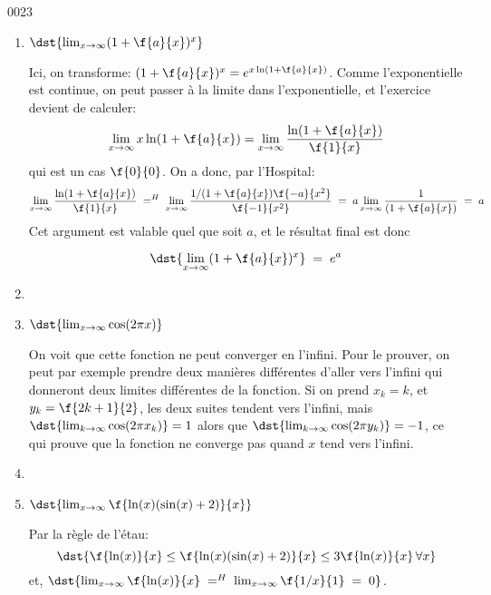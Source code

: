 \begin{corrige}{0023}
\begin{alternative}
\begin{enumerate}
		\item $\dst{ \lim_{x\rightarrow  \infty}(1+\f{a}{x})^x}$ \hs
		 
		Ici, on transforme: $ (1+\f{a}{x})^x = e^{x\ln(1+\f{a}{x})}$. Comme l'exponentielle est continue, on peut passer à la limite dans l'exponentielle, et l'exercice devient de calculer:
		 \[\lim_{x\rightarrow  \infty}x\ln(1+\f{a}{x}) = \lim_{x\rightarrow  \infty}\dfrac{\ln(1+\f{a}{x})}{\f{1}{x}}\]
		qui est un cas $\f{0}{0}$. On a donc, par l'Hospital:
		  \[\lim_{x\rightarrow  \infty}\dfrac{\ln(1+\f{a}{x})}{\f{1}{x}} \; =^H\;   \lim_{x\rightarrow  \infty}\dfrac{1/(1+\f{a}{x})\f{-a}{x^2}}{\f{-1}{x^2}} \; = \;      a\lim_{x\rightarrow  \infty}\dfrac{1}{(1+\f{a}{x})}   \;=\; a       \]
		Cet argument est valable quel que soit $a$, et le résultat final est donc  
		 
		 \[\dst{ \lim_{x\rightarrow  \infty}(1+\f{a}{x})^x} \;= \; e^a\] 
		 
		\item

		 \item $\dst{\lim_{x\rightarrow \infty} \cos(2\pi x)}$\hs
		 
		 On voit que cette fonction ne peut converger en l'infini. Pour le prouver, on peut par exemple prendre deux manières différentes d'aller vers l'infini qui donneront deux limites différentes de la fonction. 
		Si on prend $x_k=k$, et $y_k = \f{2k+1}{2}$, les deux suites tendent vers l'infini, mais  
		 $\dst{\lim_{k\rightarrow \infty} \cos(2\pi x_k)} = 1$ alors que $\dst{\lim_{k\rightarrow \infty} \cos(2\pi y_k)} =  -1$, ce qui prouve que la fonction ne converge pas quand $x$ tend vers l'infini.
		 
		\item 

		  \item $\dst{\lim_{x\rightarrow \infty} \f{\ln(x)(\sin(x)+2)}{x}}$\hs
		 
		 Par la règle de l'étau:\[\dst{\f{\ln(x)}{x} \leq \f{\ln(x)(\sin(x)+2)}{x} \leq 3\f{\ln(x)}{x} \, \forall x}\]
		 et, $\dst{\lim_{x\rightarrow \infty} \f{\ln(x)}{x} \; =^H \; \lim_{x\rightarrow \infty} \f{1/x}{1}  \;=\;0}$.
		 
	\end{enumerate}
\end{alternative}

\end{corrige}
